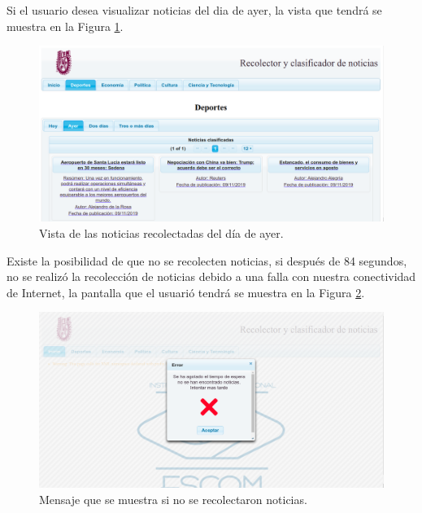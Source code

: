 Si el usuario desea visualizar noticias del dia de ayer, la vista que tendrá se muestra en la Figura \ref{fig:vistaNoticiasAyer}.
\\
\begin{figure}[H]
\centering
\includegraphics[scale=0.29]{imagenes/Capitulo5/noticiasDeAyer.png}
\caption{Vista de las noticias recolectadas del día de ayer.}
\label{fig:vistaNoticiasAyer}
\end{figure}

Existe la posibilidad de que no se recolecten noticias, si después de 84 segundos, no se realizó la recolección de noticias debido a una falla con nuestra conectividad de Internet, la pantalla que el usuarió tendrá se muestra en la Figura \ref{fig:notNoRec}.
\\
\begin{figure}[H]
\centering
\includegraphics[scale=0.29]{imagenes/Capitulo5/errorConectividad.png}
\caption{Mensaje que se muestra si no se recolectaron noticias.}
\label{fig:notNoRec}
\end{figure}

